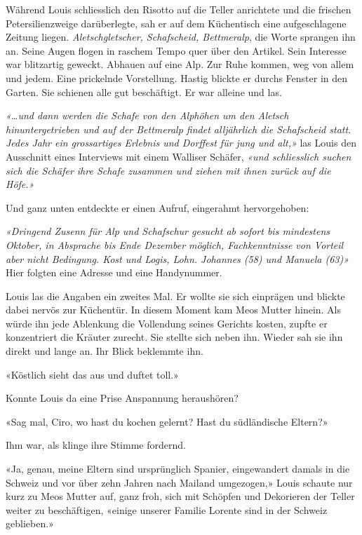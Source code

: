 
Während Louis schliesslich den Risotto auf die Teller anrichtete und die
frischen Petersilienzweige darüberlegte, sah er auf dem Küchentisch eine
aufgeschlagene Zeitung liegen. \emph{Aletschgletscher, Schafscheid,
Bettmeralp}, die Worte sprangen ihn an. Seine Augen flogen in raschem
Tempo quer über den Artikel. Sein Interesse war blitzartig geweckt. 
Abhauen auf eine Alp. Zur Ruhe kommen, weg von allem und jedem. Eine prickelnde Vorstellung.
Hastig blickte er durchs Fenster in den Garten. Sie schienen alle gut beschäftigt. Er war alleine und las.

\sectionbreak  

\emph{«…und dann werden die Schafe von den Alphöhen um den Aletsch
hinuntergetrieben und auf der Bettmeralp findet alljährlich die 
Schafscheid statt. Jedes Jahr ein grossartiges Erlebnis und
Dorffest für jung und alt,»} las Louis den Ausschnitt eines Interviews
mit einem Walliser Schäfer, \emph{«und schliesslich suchen sich die Schäfer
ihre Schafe zusammen und ziehen mit ihnen zurück auf die Höfe.»}
 
Und ganz unten entdeckte er einen Aufruf, eingerahmt hervorgehoben:

\emph{«Dringend Zusenn für Alp und Schafschur gesucht ab sofort bis mindestens
Oktober, in Absprache bis Ende Dezember möglich, Fachkenntnisse von
Vorteil aber nicht Bedingung. Kost und Logis, Lohn. Johannes (58) und
Manuela (63)»}
Hier folgten eine Adresse und eine Handynummer.

\sectionbreak  

Louis las die Angaben ein zweites Mal. Er wollte sie sich einprägen
und blickte dabei nervös zur Küchentür. In diesem Moment kam Meos
Mutter hinein. Als würde ihn jede Ablenkung die Vollendung seines Gerichts kosten, zupfte er konzentriert die Kräuter zurecht. Sie stellte sich neben ihn. Wieder sah sie ihn direkt und lange an. Ihr Blick beklemmte ihn.

«Köstlich sieht das aus und duftet toll.»

Konnte Louis da eine Prise Anspannung heraushören?

«Sag mal, Ciro, wo hast du kochen gelernt? Hast du südländische Eltern?»

Ihm war, als klinge ihre Stimme fordernd. 

«Ja, genau, meine Eltern sind ursprünglich Spanier, eingewandert damals
in die Schweiz und vor über zehn Jahren nach Mailand umgezogen,» Louis
schaute nur kurz zu Meos Mutter auf, ganz froh, sich mit Schöpfen und
Dekorieren der Teller weiter zu beschäftigen, «einige unserer Familie
Lorente sind in der Schweiz geblieben.»

